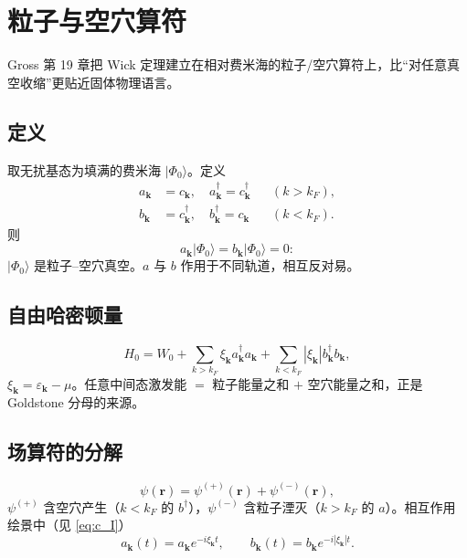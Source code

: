 \section{粒子与空穴算符}

Gross 第 19 章把 Wick 定理建立在相对费米海的粒子/空穴算符上，比“对任意真空收缩”更贴近固体物理语言。

\subsection{定义}

取无扰基态为填满的费米海 $|\Phi_0\rangle$。定义
\begin{equation}
\begin{aligned}
  a_{\mathbf{k}}&=c_{\mathbf{k}},
  \quad
  a_{\mathbf{k}}^\dagger=c_{\mathbf{k}}^\dagger
  && (k>k_F),\\
  b_{\mathbf{k}}&=c_{\mathbf{k}}^\dagger,
  \quad
  b_{\mathbf{k}}^\dagger=c_{\mathbf{k}}
  && (k<k_F).
\end{aligned}
\label{eq:ph_ops}
\end{equation}
则
\begin{equation}
  a_{\mathbf{k}}|\Phi_0\rangle=b_{\mathbf{k}}|\Phi_0\rangle=0:
\end{equation}
$|\Phi_0\rangle$ 是粒子--空穴真空。$a$ 与 $b$ 作用于不同轨道，相互反对易。

\subsection{自由哈密顿量}

\begin{equation}
  H_0
  =W_0
  +\sum_{k>k_F}\xi_{\mathbf{k}}a_{\mathbf{k}}^\dagger a_{\mathbf{k}}
  +\sum_{k<k_F}|\xi_{\mathbf{k}}|b_{\mathbf{k}}^\dagger b_{\mathbf{k}},
\end{equation}
$\xi_{\mathbf{k}}=\varepsilon_{\mathbf{k}}-\mu$。任意中间态激发能 $=$ 粒子能量之和 $+$ 空穴能量之和，正是 Goldstone 分母的来源。

\subsection{场算符的分解}

\begin{equation}
  \psi(\mathbf{r})
  =\psi^{(+)}(\mathbf{r})+\psi^{(-)}(\mathbf{r}),
\end{equation}
$\psi^{(+)}$ 含空穴产生（$k<k_F$ 的 $b^\dagger$），$\psi^{(-)}$ 含粒子湮灭（$k>k_F$ 的 $a$）。相互作用绘景中（见 \eqref{eq:c_I}）
\begin{equation}
  a_{\mathbf{k}}(t)=a_{\mathbf{k}}e^{-i\xi_{\mathbf{k}}t},
  \qquad
  b_{\mathbf{k}}(t)=b_{\mathbf{k}}e^{-i|\xi_{\mathbf{k}}|t}.
\end{equation}


